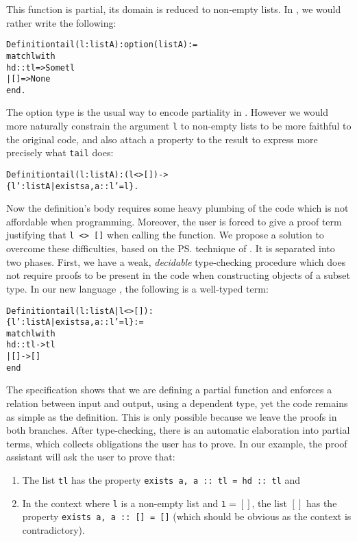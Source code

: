 \documentclass{llncs}
\newenvironment{code}{\begin{alltt}\vspace{-1.4em}}{\vspace{-1.4em}\end{alltt}}
\def\id#1{\texttt{#1}}
\begin{document}
This function is partial, its domain is reduced to non-empty lists. In
\Coq, we would rather write the following:
\begin{code}
  Definition tail (l : list A) : option (list A) :=
    match l with
      hd :: tl => Some tl
    | [] => None
    end.
\end{code}

The option type is the usual way to encode partiality in
\Coq. However we would more naturally constrain the argument \id{l} to
non-empty lists to be more faithful to the original \ML code, and also
attach a property to the result to express more precisely what \id{tail}
does:
\begin{code}
  Definition tail (l : list A) : (l <> []) -> 
  \{ l' : list A | exists a, a :: l' = l \}.
\end{code}
Now the definition's body requires some heavy plumbing of the code which is 
not affordable when programming. Moreover, the user is forced to give a
proof term justifying that \verb|l <> []| when calling the function.
We propose a solution to overcome these difficulties, based on the \ps{}
\cite{Shankar&Owre:WADT99} technique of \PVS{}
\cite{PVS-Semantics:TR}. It is separated into two phases. First, we have
a weak, \emph{decidable} type-checking
procedure which does not require proofs to be present in the code when
constructing objects of a subset type. In our new language \Russell, the
following is a well-typed term:
\begin{code}
  Definition tail ( l : list A | l <> [] ) : 
    \{ l' : list A | exists a, a :: l' = l \} := 
  match l with
    hd :: tl -> tl
  | [] -> []
  end
\end{code}

The specification shows that we are defining a partial function and
enforces a relation between input and output, using a dependent type, yet the
code remains as simple as the \ML{} definition. This is only possible
because we leave the proofs in both branches. After type-checking,
there is an automatic elaboration into partial \Coq terms, which collects
obligations the user has to prove. In our example,
the proof assistant will ask the user to prove that:
\begin{enumerate}
\item The list \verb|tl| has the property \verb|exists a, a :: tl = hd :: tl|
  and
\item In the context where
  \id{l} is a non-empty list and $\texttt{l} = []$, the list $[]$ has the property
  \verb|exists a, a :: [] = []| (which should be obvious as the context is contradictory).
\end{enumerate}
\end{document}
